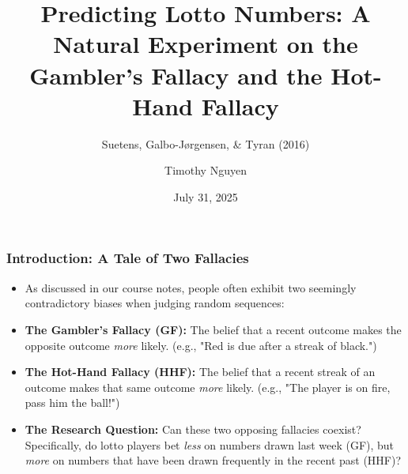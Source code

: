 \documentclass{beamer}
\title[Predicting Lotto Numbers]{Predicting Lotto Numbers: A Natural Experiment on the Gambler's Fallacy and the Hot-Hand Fallacy}
\subtitle{Suetens, Galbo-Jørgensen, \& Tyran (2016)}
\author{Timothy Nguyen}
\institute{EC323 Behavioral Economics \\ Professor Jawwad Noor}
\date{July 31, 2025}
\begin{document}
\begin{frame}
    \titlepage
\end{frame}

\begin{frame}
    \frametitle{Introduction: A Tale of Two Fallacies}
    \begin{itemize}
        \item As discussed in our course notes, people often exhibit two seemingly contradictory biases when judging random sequences:
        \vspace{1em}
        \item \textbf{The Gambler's Fallacy (GF):} The belief that a recent outcome makes the opposite outcome \textit{more} likely. (e.g., "Red is due after a streak of black.")
        \vspace{1em}
        \item \textbf{The Hot-Hand Fallacy (HHF):} The belief that a recent streak of an outcome makes that same outcome \textit{more} likely. (e.g., "The player is on fire, pass him the ball!")
        \vspace{1em}
        \item \textbf{The Research Question:} Can these two opposing fallacies coexist? Specifically, do lotto players bet \textit{less} on numbers drawn last week (GF), but \textit{more} on numbers that have been drawn frequently in the recent past (HHF)?
    \end{itemize}
\end{frame}
\end{document}
